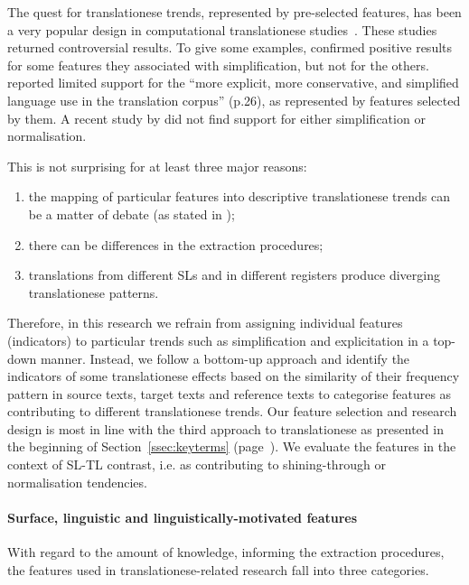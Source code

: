 The quest for translationese trends, represented by pre-selected features, has been a very popular design in computational translationese studies~\cite[and most recently~\cite{Hu2021}]{Corpas2008,Ilisei2010,Volansky2015}.
These studies returned controversial results. To give some examples, \citet{Corpas2008} confirmed positive results for some features they associated with simplification, but not for the others. \citet{Kruger2010} reported limited support for the ``more explicit, more conservative, and simplified language use in the translation corpus'' (p.26), as represented by features selected by them. A recent study by \citet{Hu2021} did not find support for either simplification or normalisation.

This is not surprising for at least three major reasons: 
\begin{enumerate} \compresslist{}
	\item the mapping of particular features into descriptive translationese trends can be a matter of debate (as stated in \citet[p.25]{Zanettin2013});
	\item there can be differences in the extraction procedures;
	\item translations from different SLs and in different registers produce diverging translationese patterns.
\end{enumerate}

Therefore, in this research we refrain from assigning individual features (indicators) to particular trends such
as simplification and explicitation in a top-down manner. Instead, we follow a bottom-up approach and identify
the indicators of some translationese effects based on the similarity of their frequency pattern in
source texts, target texts and reference texts to categorise features as contributing to different translationese trends.
Our feature selection and research design is most in line with the third approach to translationese as presented in the beginning of Section~\ref{ssec:keyterms} (page~\pageref{ssec:keyterms}). 
We evaluate the features in the context of SL-TL contrast, i.e. as contributing to shining-through or normalisation tendencies.
\label{pg:coling_end}

\paragraph{Surface, linguistic and linguistically-motivated features} With regard to the amount of knowledge, informing the extraction procedures, the features used in translationese-related research fall into three categories. 

